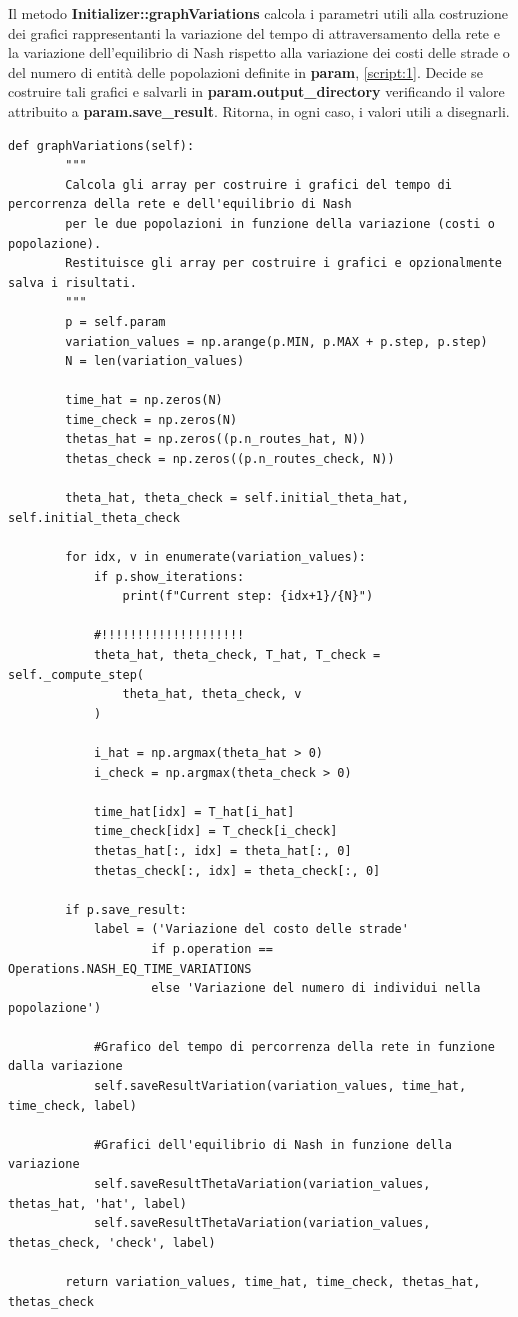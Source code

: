 Il metodo \textbf{Initializer::graphVariations} calcola i parametri utili alla costruzione dei grafici rappresentanti la variazione del tempo di 
attraversamento della rete e la variazione dell'equilibrio di Nash rispetto alla variazione dei costi delle strade o del numero di entità delle 
popolazioni definite in \textbf{param}, \autoref{script:1}. Decide se costruire tali grafici e salvarli in \textbf{param.output\_directory}
verificando il valore attribuito a \textbf{param.save\_result}. Ritorna, in ogni caso, i valori utili a disegnarli.

\begin{lstlisting}[style=myStile, caption={Initializer::graphVariations}, label={script:6}]
    def graphVariations(self):
        """
        Calcola gli array per costruire i grafici del tempo di percorrenza della rete e dell'equilibrio di Nash
        per le due popolazioni in funzione della variazione (costi o popolazione).
        Restituisce gli array per costruire i grafici e opzionalmente salva i risultati.
        """
        p = self.param
        variation_values = np.arange(p.MIN, p.MAX + p.step, p.step)
        N = len(variation_values)

        time_hat = np.zeros(N)
        time_check = np.zeros(N)
        thetas_hat = np.zeros((p.n_routes_hat, N))
        thetas_check = np.zeros((p.n_routes_check, N))

        theta_hat, theta_check = self.initial_theta_hat, self.initial_theta_check

        for idx, v in enumerate(variation_values):
            if p.show_iterations:
                print(f"Current step: {idx+1}/{N}")

            #!!!!!!!!!!!!!!!!!!!!
            theta_hat, theta_check, T_hat, T_check = self._compute_step(
                theta_hat, theta_check, v
            )

            i_hat = np.argmax(theta_hat > 0)
            i_check = np.argmax(theta_check > 0)

            time_hat[idx] = T_hat[i_hat]
            time_check[idx] = T_check[i_check]
            thetas_hat[:, idx] = theta_hat[:, 0]
            thetas_check[:, idx] = theta_check[:, 0]

        if p.save_result:
            label = ('Variazione del costo delle strade'
                    if p.operation == Operations.NASH_EQ_TIME_VARIATIONS
                    else 'Variazione del numero di individui nella popolazione')

            #Grafico del tempo di percorrenza della rete in funzione dalla variazione
            self.saveResultVariation(variation_values, time_hat, time_check, label)
            
            #Grafici dell'equilibrio di Nash in funzione della variazione
            self.saveResultThetaVariation(variation_values, thetas_hat, 'hat', label)
            self.saveResultThetaVariation(variation_values, thetas_check, 'check', label)

        return variation_values, time_hat, time_check, thetas_hat, thetas_check
\end{lstlisting}

